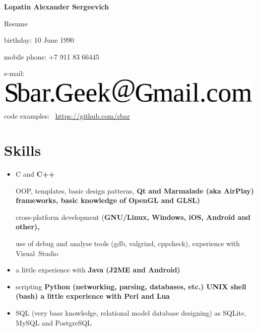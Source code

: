 \begin{center}
\fontsize{16pt}{14pt}\selectfont
\bfseries Lopatin Alexander Sergeevich\mdseries

\fontsize{14pt}{14pt}\selectfont
Resume
\end{center}

{
\fontsize{12pt}{12pt}\selectfont
\begin{flushright}
\item birthday: 10 June 1990
\item mobile phone: +7 911 83 66445
\item e-mail: \includegraphics[scale=0.2]{email}
\item code examples: \
\href{https://github.com/sbar?tab=repositories}{https://github.com/sbar}
\end{flushright}
}

\section{Skills}
\begin{itemize}
\item C and \bfseries C++\mdseries

\subitem OOP, templates, basic design patterns,
\bfseries Qt \mdseries and
\bfseries Marmalade \mdseries (aka \bfseries AirPlay\mdseries) frameworks,
basic knowledge of \bfseries OpenGL \mdseries and \bfseries GLSL\mdseries)

\subitem cross-platform development
(\bfseries GNU/Linux\mdseries, Windows, iOS,
\bfseries Android \mdseries and other),

\subitem use of debug and analyse tools (gdb, valgrind, cppcheck),
experience with Visual~Studio

\item a little experience with \bfseries Java \mdseries (J2ME and Android)

\item scripting
\subitem \bfseries Python \mdseries (networking, parsing, databases, etc.)
\subitem \bfseries UNIX shell (bash)\mdseries
\subitem a little experience with
\bfseries Perl \mdseries and \bfseries Lua\mdseries

\item SQL (very base knowledge, relational model database designing)
as SQLite, MySQL and PostgreSQL
\end{itemize}

